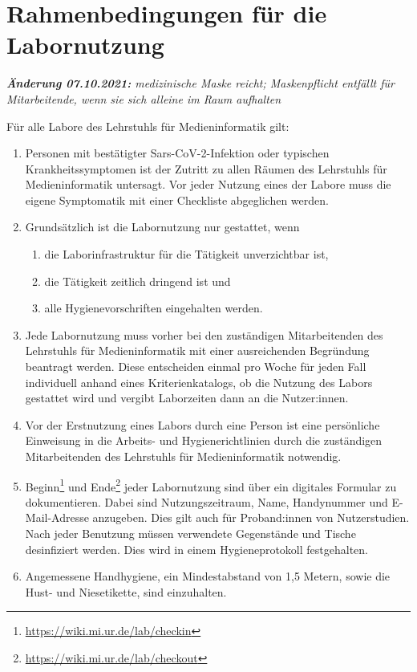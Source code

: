 \section{Rahmenbedingungen für die Labornutzung}\label{sec:allgemein}

\noindent
\emph{\textbf{Änderung 07.10.2021:} medizinische Maske reicht; Maskenpflicht entfällt für Mitarbeitende, wenn sie sich alleine im Raum aufhalten}
\medskip

\noindent
Für alle Labore des Lehrstuhls für Medieninformatik gilt:

\begin{enumerate}
    \item{Personen mit bestätigter Sars-CoV-2-Infektion oder typischen Krankheitssymptomen ist der Zutritt zu allen Räumen des Lehrstuhls für Medieninformatik untersagt. Vor jeder Nutzung eines der Labore muss die eigene Symptomatik mit einer Checkliste abgeglichen werden.}
    \item Grundsätzlich ist die Labornutzung nur gestattet, wenn
    \begin{enumerate}
        \item die Laborinfrastruktur für die Tätigkeit unverzichtbar ist,
        \item die Tätigkeit zeitlich dringend ist und 
        \item alle Hygienevorschriften eingehalten werden.
    \end{enumerate}
    \item{Jede Labornutzung muss vorher bei den zuständigen Mitarbeitenden des Lehrstuhls für Medieninformatik mit einer ausreichenden Begründung beantragt werden. Diese entscheiden einmal pro Woche für jeden Fall individuell anhand eines Kriterienkatalogs, ob die Nutzung des Labors gestattet wird und vergibt Laborzeiten dann an die Nutzer:innen.}
    \item{Vor der Erstnutzung eines Labors durch eine Person ist eine persönliche Einweisung in die Arbeits- und Hygienerichtlinien durch die zuständigen Mitarbeitenden des Lehrstuhls für Medieninformatik notwendig.}
    \item{Beginn\footnote{\url{https://wiki.mi.ur.de/lab/checkin}} und Ende\footnote{\url{https://wiki.mi.ur.de/lab/checkout}} jeder Labornutzung sind über ein digitales Formular zu dokumentieren.
    Dabei sind Nutzungszeitraum, Name, Handynummer und E-Mail-Adresse anzugeben.
    Dies gilt auch für Proband:innen von Nutzerstudien.
    Nach jeder Benutzung müssen verwendete Gegenstände und Tische desinfiziert werden.
    Dies wird in einem Hygieneprotokoll festgehalten.}
    \item{Angemessene Handhygiene, ein Mindestabstand von 1,5 Metern, sowie die Hust- und Niesetikette, sind einzuhalten.

}
\end{enumerate}
